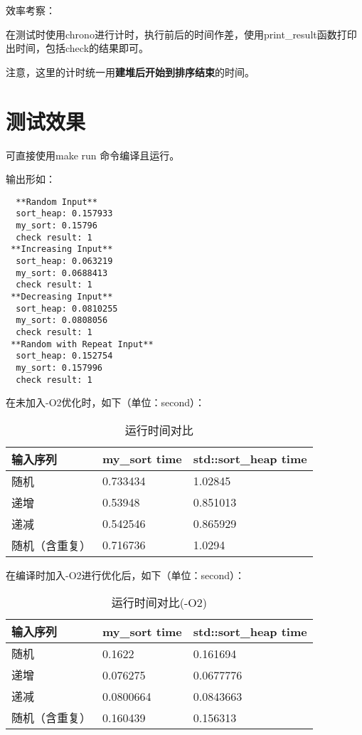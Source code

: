 \documentclass[UTF8]{ctexart}
\begin{document}
效率考察：

在测试时使用chrono进行计时，执行前后的时间作差，使用print\_result函数打印出时间，包括check的结果即可。

注意，这里的计时统一用\textbf{建堆后开始到排序结束}的时间。

\section{测试效果}

可直接使用make run 命令编译且运行。

输出形如：
\begin{verbatim}
  **Random Input**
  sort_heap: 0.157933
  my_sort: 0.15796
  check result: 1
 **Increasing Input**
  sort_heap: 0.063219
  my_sort: 0.0688413
  check result: 1
 **Decreasing Input**
  sort_heap: 0.0810255
  my_sort: 0.0808056
  check result: 1
 **Random with Repeat Input**
  sort_heap: 0.152754
  my_sort: 0.157996
  check result: 1
\end{verbatim}

在未加入-O2优化时，如下（单位：second）：

\begin{table}[H]
  \begin{center}
  \caption{运行时间对比}
  \begin{tabular}{l|l|l}
  \label{table1}
  \textbf{输入序列} & \textbf{my\_sort time} & \textbf{std::sort\_heap time}\\
  \hline
  随机 & 0.733434 & 1.02845\\
  递增 & 0.53948 & 0.851013\\
  递减 & 0.542546 & 0.865929\\
  随机（含重复） & 0.716736 & 1.0294
  \end{tabular}
  \end{center}
\end{table}

在编译时加入-O2进行优化后，如下（单位：second）：

\begin{table}[H]
  \begin{center}
  \caption{运行时间对比(-O2)}
  \begin{tabular}{l|l|l}
  \textbf{输入序列} & \textbf{my\_sort time} & \textbf{std::sort\_heap time}\\
  \hline
  随机 & 0.1622 & 0.161694 \\
  递增 & 0.076275 & 0.0677776 \\
  递减 & 0.0800664 & 0.0843663 \\
  随机（含重复） & 0.160439 & 0.156313
  \end{tabular}
  \end{center}
\end{table}
\end{document}
